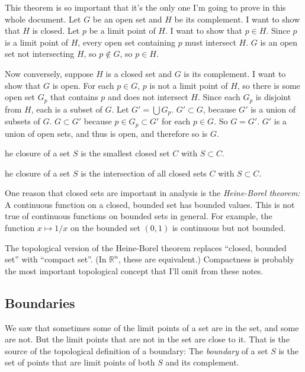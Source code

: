 \documentclass{article}
\def\R{{\mathbb R}}
\def\Rn{{\R^n}}
\newcounter{exercisecounter}\setcounter{exercisecounter}{1}
\def\Exercise.#1\par{{\item\small \makebox{\bf Exercise \number\theexercisecounter.\hspace{0.5em}}\unskip\ignorespaces#1\addtocounter{exercisecounter}{1}}}
\begin{document}
This theorem is so important that it's the only one I'm going to prove
in this whole document.  Let $G$ be an open set and $H$ be its
complement.  I want to show that $H$ is closed.  Let $p$ be a limit
point of $H$.  I want to show that $p\in H$.  Since $p$ is a limit
point of $H$, every open set containing $p$ must intersect $H$.  $G$
is an open set not intersecting $H$, so $p\not\in G$, so $p\in H$.

Now conversely, suppose $H$ is a closed set and $G$ is its
complement.  I want to show that $G$ is open.  For each $p\in G$, $p$
is not a limit point of $H$, so there is some open set $G_p$ that
contains $p$ and does not intersect $H$.  Since each $G_p$ is disjoint
from $H$, each is a subset of $G$.   Let $G'=\bigcup G_p$.  
$G'\subset G$, because $G'$ is a union of subsets of $G$.  
$G\subset G'$ because $p\in G_p\subset G'$ for each $p\in G$.
So $G=G'$.  $G'$ is a
union of open sets, and thus is open, and therefore so is $G$.

\begin{itemize}
\Exercise. The closure of a set $S$ is the smallest closed set $C$
with $S\subset C$.

\Exercise. The closure of a set $S$ is the intersection of all closed sets $C$
with $S\subset C$.


\end{itemize}

One reason that closed sets are important in analysis is the
{\em Heine-Borel theorem:\/} A continuous function on a closed,
bounded set has bounded values.  This is not true of continuous
functions on bounded sets in general.  For example, the function $x
\mapsto 1/x$ on the bounded set $(0, 1)$ is continuous but not
bounded.

The topological version of the Heine-Borel theorem replaces ``closed,
bounded set'' with ``compact set''.  (In $\Rn$, these are equivalent.)
Compactness is probably the most important topological concept that
I'll omit from these notes.

\subsection*{Boundaries}

We saw that sometimes some of the limit points of a set are in the
set, and some are not.  But the limit points that are not in the set
are close to it.  That is the source of the topological definition of
a boundary: The {\em boundary\/} of a set $S$ is the set of points
that are limit points of both $S$ and its complement.
\end{document}
